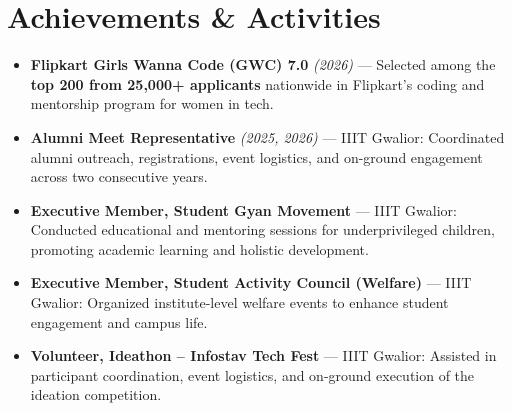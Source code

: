 \documentclass[letterpaper,11pt]{article}
\begin{document}
\section{Achievements \& Activities}
  \begin{itemize}[leftmargin=0.2in, label=\small$\bullet$, topsep=0pt, partopsep=0pt, itemsep=3pt, parsep=0pt]
    \small\item \textbf{Flipkart Girls Wanna Code (GWC) 7.0} \textit{(2026)} — Selected among the \textbf{top 200 from 25,000+ applicants} nationwide in Flipkart's coding and mentorship program for women in tech.

    \small\item \textbf{Alumni Meet Representative} \textit{(2025, 2026)} — IIIT Gwalior: Coordinated alumni outreach, registrations, event logistics, and on-ground engagement across two consecutive years.

    \small\item \textbf{Executive Member, Student Gyan Movement} — IIIT Gwalior: Conducted educational and mentoring sessions for underprivileged children, promoting academic learning and holistic development.

    \small\item \textbf{Executive Member, Student Activity Council (Welfare)} — IIIT Gwalior: Organized institute-level welfare events to enhance student engagement and campus life.

    \small\item \textbf{Volunteer, Ideathon – Infostav Tech Fest} — IIIT Gwalior: Assisted in participant coordination, event logistics, and on-ground execution of the ideation competition.
  \end{itemize}
\end{document}
